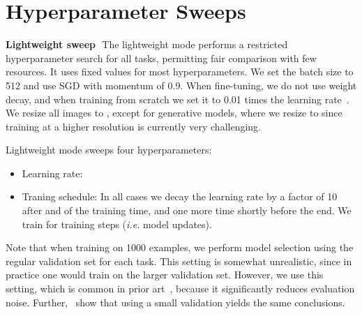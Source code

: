 \documentclass{article}
\renewcommand{\paragraph}[1]{{\bf #1}\,\,}
\begin{document}
\clearpage
\section{Hyperparameter Sweeps\label{app:hyperparameter_sweep}}

\paragraph{Lightweight sweep}
The lightweight mode performs a restricted hyperparameter search for all tasks, permitting fair comparison with few resources.
It uses fixed values for most hyperparameters.
We set the batch size to 512 and use SGD with momentum of 0.9.
When fine-tuning, we do not use weight decay, and when training from scratch we set it to 0.01 times the learning rate~\citep{loshchilov2019}.
We resize all images to , except for generative models, where we resize to  since training at a higher resolution is currently very challenging.


Lightweight mode sweeps four hyperparameters:
\begin{itemize}
  \item Learning rate: 
  \item Traning schedule: In all cases we decay the learning rate by a factor of 10 after  and  of the training time, and one more time shortly before the end. We train for  training steps (\emph{i.e.} model updates).
\end{itemize}

Note that when training on 1000 examples, we perform model selection using the regular validation set for each task.
This setting is somewhat unrealistic, since in practice one would train on the larger validation set.
However, we use this setting, which is common in prior art~\citep{olivier2018}, because it significantly reduces evaluation noise.
Further,~\citet{zhai2019s4l} show that using a small validation yields the same conclusions.
\end{document}
